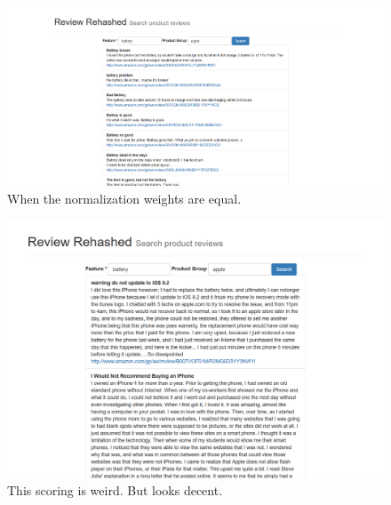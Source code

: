 \documentclass{article}
\begin{document}
\begin{description}
\begin{figure}[ht!]
  \centering
  \includegraphics[width=1\textwidth]{equal_weights}
  \caption{When the normalization weights are equal.~\label{fig:Search_Engine}}
\end{figure}

\begin{figure}[ht!]
  \centering
  \includegraphics[width=1\textwidth]{a_new_scoring}
  \caption{This scoring is weird.  But looks decent.~\label{fig:Search_Engine}}
\end{figure}

\end{description}
\end{document}

